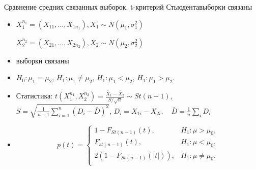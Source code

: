 \documentclass[11pt,pdf,utf8,hyperref={unicode},aspectratio=169]{beamer}
\begin{document}
\begin{frame}[label=ttest2p]{\hyperlink{onesample}{} Сравнение средних связанных выборок. t-критерий Стьюдента}{выборки связаны}
    \begin{itemize}
        \item {}

            $X_1^{n_1}=\left(X_{11},\ldots,X_{1n_1}\right), X_{1} \sim N\left(\mu_1, \sigma_1^2\right)$

            $X_2^{n_2}=\left(X_{21},\ldots,X_{2n_2}\right), X_{2} \sim N\left(\mu_2, \sigma_2^2\right)$
        \item выборки связаны
        \item  $H_0\colon \mu_1=\mu_2$,\qquad
            $H_1\colon \mu_1 \neq \mu_2$,
            $H_1\colon \mu_1 < \mu_2$,
            $H_1\colon \mu_1  >\mu_2$.
        \item Статистика: \alert{$\displaystyle
            t\left(X_1^{n_1}, X_2^{n_2}\right) = \frac{\bar{X}_1-\bar{X}_2}{S/\sqrt{n}} \sim  St(n-1)$}, \quad
            $S = \sqrt{ \frac1{n-1} \sum\limits_{i=1}^n \left(D_i-\bar{D}\right)^2 }$,
            \quad $D_i = X_{1i}-X_{2i},
            \quad \bar{D} = \frac{1}{n}\sum_i D_i$
        \item {}
            $$
                p\left(t\right) = \begin{cases}
                    1-F_{St(n-1)}(t), & H_1 \colon \mu>\mu_0, \\
                    F_{st(n-1)}(t), & H_1 \colon \mu < \mu_0, \\
                    2\left(1-F_{St(n-1)}(|t|)\right), & H_1 \colon \mu\neq\mu_0. \\
                \end{cases}
            $$

    \end{itemize}
\end{frame}
\end{document}
